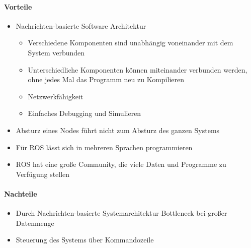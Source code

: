 \paragraph{Vorteile}
\begin{itemize}
 \item Nachrichten-basierte Software Architektur
\begin{itemize}
\item Verschiedene Komponenten sind unabhängig voneinander mit dem System verbunden
\item Unterschiedliche Komponenten können miteinander verbunden werden, ohne jedes Mal das Programm neu zu Kompilieren
\item Netzwerkfähigkeit
\item Einfaches Debugging und Simulieren
\end{itemize}
\item Absturz eines Nodes führt nicht zum Absturz des ganzen
Systems
\item Für ROS lässt sich in mehreren Sprachen programmieren
\item ROS hat eine große Community, die viele Daten und Programme zu Verfügung
stellen
\end{itemize}
\paragraph{Nachteile}
\begin{itemize}
 \item Durch Nachrichten-basierte Systemarchitektur Bottleneck bei großer Datenmenge
\item Steuerung des Systems über Kommandozeile
\end{itemize}


